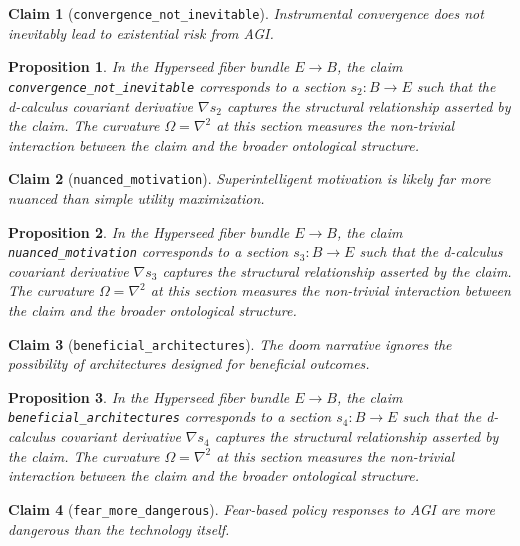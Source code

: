 \documentclass{article}
\newtheorem{claim}{Claim}
\newtheorem{proposition}{Proposition}
\begin{document}
\begin{claim}[\texttt{convergence_not_inevitable}]
Instrumental convergence does not inevitably lead to existential risk from AGI.
\end{claim}

\begin{proposition}
In the Hyperseed fiber bundle $E \to B$, the claim \texttt{convergence_not_inevitable} corresponds to a section $s_2: B \to E$ such that the d-calculus covariant derivative $\nabla s_2$ captures the structural relationship asserted by the claim. The curvature $\Omega = \nabla^2$ at this section measures the non-trivial interaction between the claim and the broader ontological structure.
\end{proposition}

\begin{claim}[\texttt{nuanced_motivation}]
Superintelligent motivation is likely far more nuanced than simple utility maximization.
\end{claim}

\begin{proposition}
In the Hyperseed fiber bundle $E \to B$, the claim \texttt{nuanced_motivation} corresponds to a section $s_3: B \to E$ such that the d-calculus covariant derivative $\nabla s_3$ captures the structural relationship asserted by the claim. The curvature $\Omega = \nabla^2$ at this section measures the non-trivial interaction between the claim and the broader ontological structure.
\end{proposition}

\begin{claim}[\texttt{beneficial_architectures}]
The doom narrative ignores the possibility of architectures designed for beneficial outcomes.
\end{claim}

\begin{proposition}
In the Hyperseed fiber bundle $E \to B$, the claim \texttt{beneficial_architectures} corresponds to a section $s_4: B \to E$ such that the d-calculus covariant derivative $\nabla s_4$ captures the structural relationship asserted by the claim. The curvature $\Omega = \nabla^2$ at this section measures the non-trivial interaction between the claim and the broader ontological structure.
\end{proposition}

\begin{claim}[\texttt{fear_more_dangerous}]
Fear-based policy responses to AGI are more dangerous than the technology itself.
\end{claim}
\end{document}

